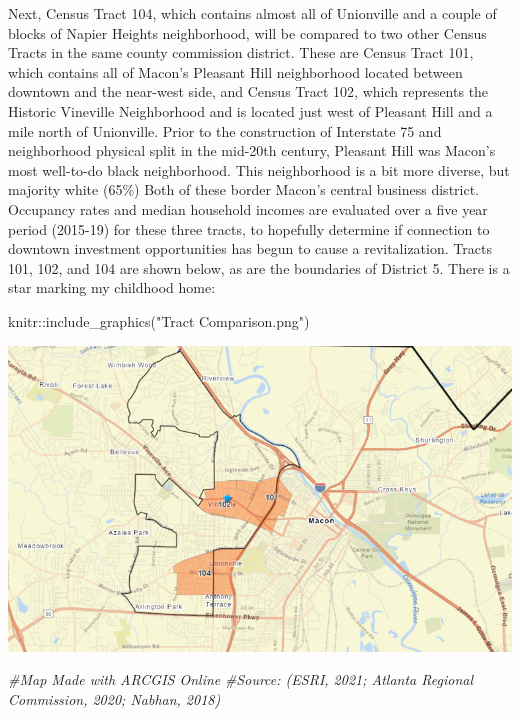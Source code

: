\documentclass[
]{article}
\newenvironment{Shaded}{\begin{snugshade}}{\end{snugshade}}
\newcommand{\CommentTok}[1]{\textcolor[rgb]{0.56,0.35,0.01}{\textit{#1}}}
\newcommand{\FunctionTok}[1]{\textcolor[rgb]{0.00,0.00,0.00}{#1}}
\newcommand{\NormalTok}[1]{#1}
\newcommand{\SpecialCharTok}[1]{\textcolor[rgb]{0.00,0.00,0.00}{#1}}
\newcommand{\StringTok}[1]{\textcolor[rgb]{0.31,0.60,0.02}{#1}}
\begin{document}
Next, Census Tract 104, which contains almost all of Unionville and a
couple of blocks of Napier Heights neighborhood, will be compared to two
other Census Tracts in the same county commission district. These are
Census Tract 101, which contains all of Macon's Pleasant Hill
neighborhood located between downtown and the near-west side, and Census
Tract 102, which represents the Historic Vineville Neighborhood and is
located just west of Pleasant Hill and a mile north of Unionville. Prior
to the construction of Interstate 75 and neighborhood physical split in
the mid-20th century, Pleasant Hill was Macon's most well-to-do black
neighborhood. This neighborhood is a bit more diverse, but majority
white (65\%) Both of these border Macon's central business district.
Occupancy rates and median household incomes are evaluated over a five
year period (2015-19) for these three tracts, to hopefully determine if
connection to downtown investment opportunities has begun to cause a
revitalization. Tracts 101, 102, and 104 are shown below, as are the
boundaries of District 5. There is a star marking my childhood home:

\begin{Shaded}
\begin{Highlighting}[]
\NormalTok{ knitr}\SpecialCharTok{::}\FunctionTok{include\_graphics}\NormalTok{(}\StringTok{"Tract Comparison.png"}\NormalTok{)}
\end{Highlighting}
\end{Shaded}

\includegraphics{Tract Comparison.png}

\begin{Shaded}
\begin{Highlighting}[]
\CommentTok{\#Map Made with ARCGIS Online}
\CommentTok{\#Source: (ESRI, 2021; Atlanta Regional Commission, 2020; Nabhan, 2018)}
\end{Highlighting}
\end{Shaded}
\end{document}
